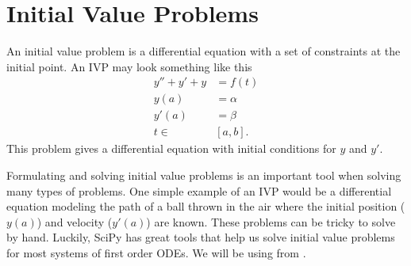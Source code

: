 \label{lab:BVPIntro}
\labdependencies{}

\section*{Initial Value Problems}

An initial value problem is a differential equation with a set of constraints at the initial point.
An IVP may look something like this
\begin{align*}
    y'' + y' + y &= f(t) \\
    y(a) &= \alpha \\
    y'(a) &= \beta \\
    t \in &[a,b].
\end{align*}
This problem gives a differential equation with initial conditions for $y$ and $y'$.

Formulating and solving initial value problems is an important tool when solving many types of problems.
One simple example of an IVP would be a differential equation modeling the path of a ball thrown in the air where the initial position ($y(a)$) and velocity ($y'(a)$) are known.
These problems can be tricky to solve by hand.
Luckily, SciPy has great tools that help us solve initial value problems for most systems of first order ODEs.
We will be using  from .

